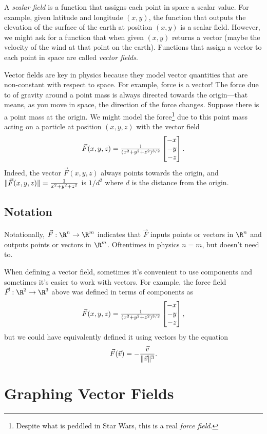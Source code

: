 A \emph{scalar field}
is a function that assigns each point in space a
scalar value.  For example, given latitude and longitude $(x,y)$,
the function that outputs the elevation of the surface of the earth
at position $(x,y)$ is a scalar field.  However,
we might ask for a function that when given $(x,y)$ returns
a vector (maybe the velocity of the wind at that point on the earth).
Functions that assign a vector to each point in space
are called \emph{vector fields}.

Vector fields are key in physics because they model
vector quantities that are non-constant with respect to
space.  For example, force is a vector!  The force due to of gravity
around a point mass is always directed towards the origin---that
means, as you move in space, the direction of the force 
changes.  Suppose there is a point mass at the origin.
We might model the force\footnote{ Despite what is peddled in
Star Wars, this is a real \emph{force field}.} due to this point mass acting on a particle
at position $(x,y,z)$ with the vector field
\[
	\vec F(x,y,z) = \tfrac{1}{(x^2+y^2+z^2)^{3/2}}\mat{-x\\-y\\-z}.
\]
Indeed, the vector $\vec F(x,y,z)$ always points towards the origin,
and $\lVert\vec F(x,y,z)\rVert=\frac{1}{x^2+y^2+z^2}$ is $1/d^2$ where $d$
is the distance from the origin.


\subsection{Notation}
Notationally, $\vec F:\R^n\to\R^m$ indicates that $\vec F$ inputs points or vectors in $\R^n$
and outputs points or vectors in $\R^m$.  Oftentimes in physics $n=m$, but doesn't need to.

When defining a vector field, sometimes it's convenient to use components
and sometimes it's easier to work with vectors.  For example, the force field
$\vec F:\R^2\to\R^3$ above was defined in terms of components as
\[
	\vec F(x,y,z) = \tfrac{1}{(x^2+y^2+z^2)^{3/2}}\mat{-x\\-y\\-z},
\]
but we could have equivalently defined it using vectors by the equation
\[
	\vec F(\vec v) = -\frac{\vec v}{\lVert\vec v\rVert^3}.
\]


\section{Graphing Vector Fields}

